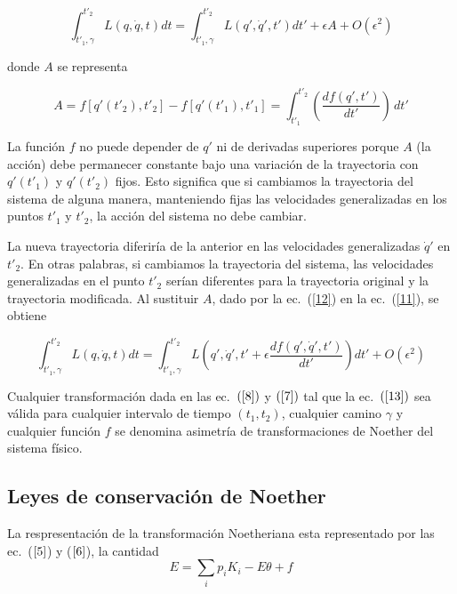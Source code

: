 \documentclass[a4paper,11pt]{article}
\begin{document}
\begin{equation}
    \int_{t'_1,\gamma}^{t'_2} L(q,\dot{q},t)dt =  \int_{t'_1,\gamma}^{t'_2} L(q',\dot{q}',t')dt' + \epsilon A + O(\epsilon^2)
\label{11}
\end{equation}

donde $A$ se representa 

\begin{equation}
A = f[q'(t'_2), t'_2] - f[q'(t'_1), t'_1] = \int_{t'_1}^{t'_2} \left(\frac{df(q', t')}{dt'} \right)\,dt'
\label{12}
\end{equation}

La función \(f\) no puede depender de \(q'\) ni de derivadas superiores porque \(A\) (la acción) debe permanecer constante bajo una variación de la trayectoria con \(q'(t'_1)\) y \(q'(t'_2)\) fijos. Esto significa que si cambiamos la trayectoria del sistema de alguna manera, manteniendo fijas las velocidades generalizadas en los puntos \(t'_1\) y \(t'_2\), la acción del sistema no debe cambiar.

La nueva trayectoria diferiría de la anterior en las velocidades generalizadas \(\dot{q}'\) en \(t'_2\). En otras palabras, si cambiamos la trayectoria del sistema, las velocidades generalizadas en el punto \(t'_2\) serían diferentes para la trayectoria original y la trayectoria modificada. Al sustituir \( A \), dado por la ec.~(\ref{12}) en la ec.~(\ref{11}), se obtiene

\begin{equation}
    \int_{t'_1,\gamma}^{t'_2} L(q,\dot{q},t)dt =  \int_{t'_1,\gamma}^{t'_2} L\left(q',\dot{q}',t'+\epsilon \frac{df(q',\dot{q}',t')}{dt'}\right)dt' + O(\epsilon^2)
\label{13}
\end{equation}

Cualquier transformación dada en las ec.~\((\ref{8})\) y \((\ref{7})\) tal que la ec.~\((\ref{13})\) sea válida para cualquier intervalo de tiempo \((t_1, t_2)\), cualquier camino \(\gamma\) y cualquier función \(f\) se denomina asimetría de transformaciones de Noether del sistema físico.



\subsection{Leyes de conservación de Noether}

La respresentación de la transformación Noetheriana esta representado por las ec.~(\( \ref{5} \)) y (\(\ref{6}\)), la cantidad 
\begin{equation}
    E=\sum_i p_i K_i - E\theta+f
\end{equation}
\end{document}
